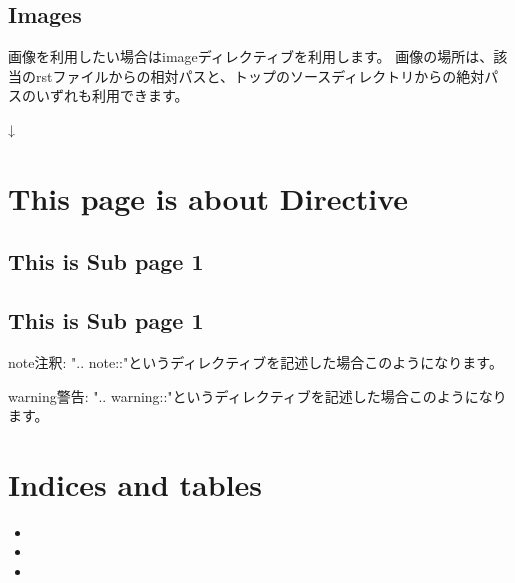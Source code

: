 \documentclass[letterpaper,10pt,dvipdfmx,openany,oneside]{sphinxmanual}
\begin{document}
\section{Images}
\label{\detokenize{1.chapter/basic_syntax:images}}
画像を利用したい場合はimageディレクティブを利用します。
画像の場所は、該当のrstファイルからの相対パスと、トップのソースディレクトリからの絶対パスのいずれも利用できます。

%
\begin{sphinxVerbatim}[commandchars=\\\{\}]
  
     
    
\end{sphinxVerbatim}

↓



\chapter{This page is about Directive}
\label{\detokenize{2.chapter/directive::doc}}\label{\detokenize{2.chapter/directive:this-page-is-about-directive}}

\section{This is Sub page 1}
\label{\detokenize{2.chapter/subpage/sub1::doc}}\label{\detokenize{2.chapter/subpage/sub1:this-is-sub-page-1}}

\section{This is Sub page 1}
\label{\detokenize{2.chapter/subpage/sub2::doc}}\label{\detokenize{2.chapter/subpage/sub2:this-is-sub-page-1}}
\begin{sphinxadmonition}{note}{注釈:}
".. note::"というディレクティブを記述した場合このようになります。
\end{sphinxadmonition}

\begin{sphinxadmonition}{warning}{警告:}
".. warning::"というディレクティブを記述した場合このようになります。
\end{sphinxadmonition}


\chapter{Indices and tables}
\label{\detokenize{index:indices-and-tables}}\begin{itemize}
\item {} 

\item {} 

\item {} 

\end{itemize}



\renewcommand{\indexname}{索引}
\printindex
\end{document}
